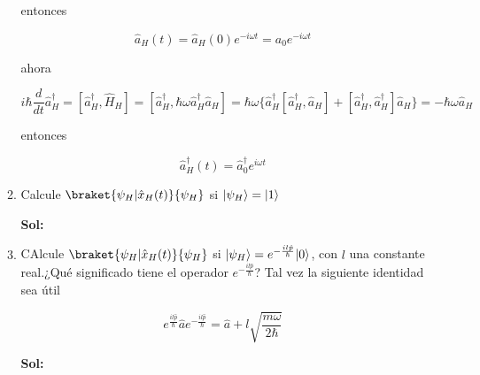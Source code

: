 \documentclass[12pt,a4paper]{article}
\DeclarePairedDelimiter\ket{\lvert}{\rangle}
\begin{document}
\begin{enumerate}
\begin{enumerate}
    entonces
    
    \begin{equation*}
        \hat{a}_{H}(t) = \hat{a}_{H}(0) e^{-i \omega t} = a_0 e^{-i \omega t}
    \end{equation*}
    
    ahora
    
    \begin{equation*}
        i \hbar \frac{d}{dt} \hat{a}_{H}^{\dagger}= [\hat{a}_{H}^{\dagger}, \hat{H}_{H}] = [\hat{a}_{H}^{\dagger}, \hbar \omega \hat{a}_{H}^{\dagger} \hat{a}_{H}]= \hbar \omega \{\hat{a}_{H}^{\dagger}[\hat{a}_{H}^{\dagger}, \hat{a}_{H}]+ [\hat{a}_{H}^{\dagger}, \hat{a}_{H}^{\dagger}] \hat{a}_{H} \} = -\hbar \omega \hat{a}_{H}
    \end{equation*}
    
    entonces
    
    \begin{equation*}
        \hat{a}_{H}^{\dagger} (t) = \hat{a}_{0}^{\dagger} e^{i \omega t}
    \end{equation*}
    
    \item Calcule $\braket{\psi_{H}|\hat{x}_{H}(t)}{\psi_{H}}$ si $\ket{\psi_{H}} = \ket{1}$
    
    \textbf{Sol:}
    
    \item CAlcule $\braket{\psi_{H}| \hat{x}_{H}(t)}{\psi_{H}}$ si $\ket{\psi_{H}}= e^{-\frac{i l \hat{p}}{\hbar}}\ket{0}$, con $l$ una constante real.¿Qué significado tiene el operador $e^{-\frac{i l \hat{p}}{\hbar}}$? Tal vez la siguiente identidad sea útil
    
    \begin{equation*}
        e^{\frac{i l \hat{p}}{\hbar}} \hat{a} e^{- \frac{i l \hat{p}}{\hbar}} = \hat{a} + l \sqrt{\frac{m \omega}{2 \hbar}}
    \end{equation*}
    
    \textbf{Sol:}
    
\end{enumerate}







\end{enumerate}
\end{document}
